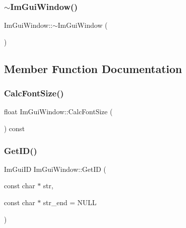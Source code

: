 \hypertarget{struct_im_gui_window_a8e81d730c3a39a71e6b6ca4654451c53}{}\label{struct_im_gui_window_a8e81d730c3a39a71e6b6ca4654451c53} 
\subsubsection{\texorpdfstring{$\sim$\+Im\+Gui\+Window()}{~ImGuiWindow()}}
{\footnotesize\ttfamily Im\+Gui\+Window\+::$\sim$\+Im\+Gui\+Window (\begin{DoxyParamCaption}{ }\end{DoxyParamCaption})}



\subsection{Member Function Documentation}
\hypertarget{struct_im_gui_window_a6881ed65e208fb6e015d3ae6bccfc794}{}\label{struct_im_gui_window_a6881ed65e208fb6e015d3ae6bccfc794} 
\subsubsection{\texorpdfstring{Calc\+Font\+Size()}{CalcFontSize()}}
{\footnotesize\ttfamily float Im\+Gui\+Window\+::\+Calc\+Font\+Size (\begin{DoxyParamCaption}{ }\end{DoxyParamCaption}) const}

\hypertarget{struct_im_gui_window_a66400a63bc0b54d7d29e08d1b1b1a42b}{}\label{struct_im_gui_window_a66400a63bc0b54d7d29e08d1b1b1a42b} 
\subsubsection{\texorpdfstring{Get\+I\+D()}{GetID()}\hspace{0.1cm}{\footnotesize\ttfamily [1/2]}}
{\footnotesize\ttfamily Im\+Gui\+ID Im\+Gui\+Window\+::\+Get\+ID (\begin{DoxyParamCaption}\item[{const char $\ast$}]{str,  }\item[{const char $\ast$}]{str\+\_\+end = {\ttfamily NULL} }\end{DoxyParamCaption})}

